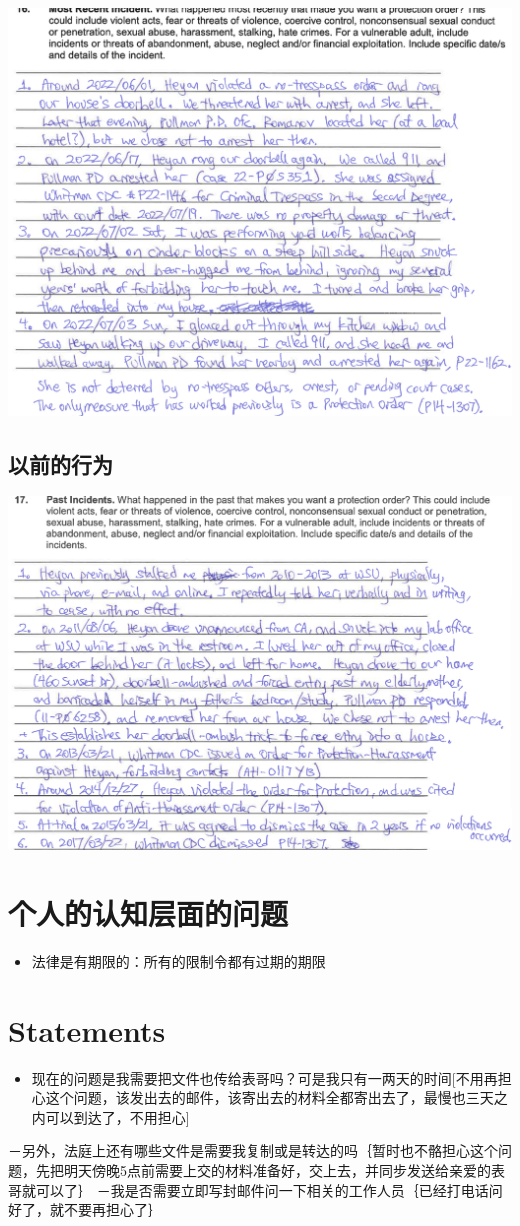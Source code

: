 \documentclass[9pt, b5paaper]{book}
\begin{document}
\includegraphics[width=.9\linewidth]{./pic/dearCousin_20220919_153946.png}
\section{以前的行为}
\label{sec-1-4}

\includegraphics[width=.9\linewidth]{./pic/dearCousin_20220919_154045.png}

\chapter{个人的认知层面的问题　　}
\label{sec-2}
\begin{itemize}
\item 法律是有期限的：所有的限制令都有过期的期限
\end{itemize}

\chapter{Statements}
\label{sec-3}
\begin{itemize}
\item 现在的问题是我需要把文件也传给表哥吗？可是我只有一两天的时间[不用再担心这个问题，该发出去的邮件，该寄出去的材料全都寄出去了，最慢也三天之内可以到达了，不用担心]
\end{itemize}
－另外，法庭上还有哪些文件是需要我复制或是转达的吗｛暂时也不骼担心这个问题，先把明天傍晚5点前需要上交的材料准备好，交上去，并同步发送给亲爱的表哥就可以了｝
－我是否需要立即写封邮件问一下相关的工作人员｛已经打电话问好了，就不要再担心了｝
\end{document}
